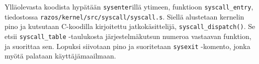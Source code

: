Ylläolevasta koodista hypätään \texttt{sysenter}illä ytimeen, funktioon \texttt{syscall\_entry}, tiedostossa \texttt{razos/kernel/src/syscall/syscall.s}. Siellä alustetaan kernelin pino ja kutsutaan C-koodilla kirjoitettu jatkokäsittelijä, \texttt{syscall\_dispatch()}. Se etsii \texttt{syscall\_table} -taulukosta järjestelmäkutsun numeroa vastaavan funktion, ja suorittaa sen. Lopuksi siivotaan pino ja suoritetaan \texttt{sysexit} -komento, jonka myötä palataan käyttäjämaailmaan.